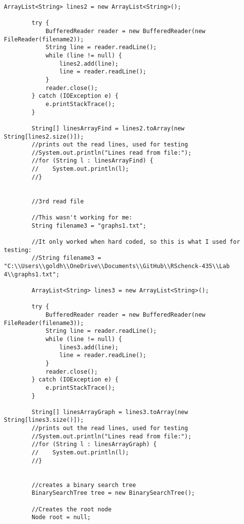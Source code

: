 \documentclass[10pt]{article}
\begin{document}
\begin{lstlisting}[frame=single, ]
        ArrayList<String> lines2 = new ArrayList<String>();

        try {
            BufferedReader reader = new BufferedReader(new FileReader(filename2));
            String line = reader.readLine();
            while (line != null) {
                lines2.add(line);
                line = reader.readLine();
            }
            reader.close();
        } catch (IOException e) {
            e.printStackTrace();
        }

        String[] linesArrayFind = lines2.toArray(new String[lines2.size()]);
        //prints out the read lines, used for testing
        //System.out.println("Lines read from file:");
        //for (String l : linesArrayFind) {
        //    System.out.println(l);
        //}


        //3rd read file

        //This wasn't working for me: 
        String filename3 = "graphs1.txt";

        //It only worked when hard coded, so this is what I used for testing:
        //String filename3 = "C:\\Users\\goldh\\OneDrive\\Documents\\GitHub\\RSchenck-435\\Lab 4\\graphs1.txt";

        ArrayList<String> lines3 = new ArrayList<String>();

        try {
            BufferedReader reader = new BufferedReader(new FileReader(filename3));
            String line = reader.readLine();
            while (line != null) {
                lines3.add(line);
                line = reader.readLine();
            }
            reader.close();
        } catch (IOException e) {
            e.printStackTrace();
        }

        String[] linesArrayGraph = lines3.toArray(new String[lines3.size()]);
        //prints out the read lines, used for testing
        //System.out.println("Lines read from file:");
        //for (String l : linesArrayGraph) {
        //    System.out.println(l);
        //}


        //creates a binary search tree
        BinarySearchTree tree = new BinarySearchTree();

        //Creates the root node
        Node root = null;


\end{lstlisting}
\end{document}
